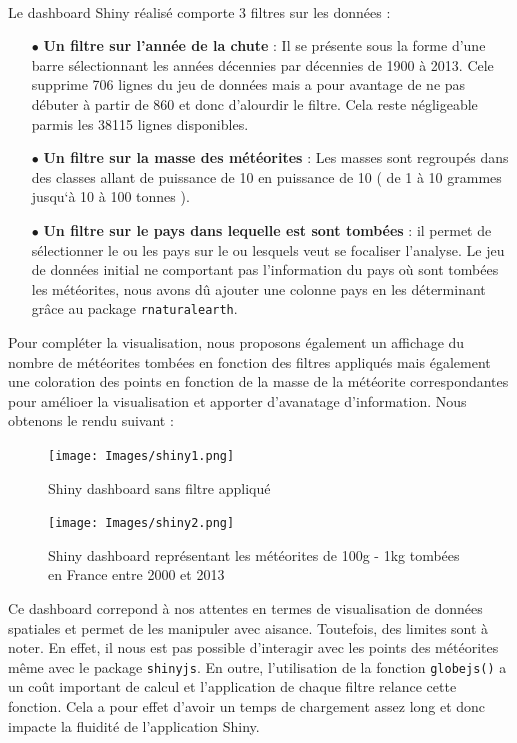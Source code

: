 \documentclass[12pt]{article}
\begin{document}
\\
Le dashboard Shiny réalisé comporte 3 filtres sur les données :\\
\begin{itemize}
    \item[$\bullet$] \textbf{Un filtre sur l'année de la chute} : Il se présente sous la forme d'une barre sélectionnant les années décennies par décennies de 1900 à 2013. Cele supprime 706 lignes du jeu de données mais a pour avantage de ne pas débuter à partir de 860 et donc d'alourdir le filtre. Cela reste négligeable parmis les 38115 lignes disponibles.\\
    \item[$\bullet$] \textbf{Un filtre sur la masse des météorites} : Les masses sont regroupés dans des classes allant de puissance de 10 en puissance de 10 ( de 1 à 10 grammes jusqu`à 10 à 100 tonnes ).\\
    \item[$\bullet$] \textbf{Un filtre sur le pays dans lequelle est sont tombées} : il permet de sélectionner le ou les pays sur le ou lesquels veut se focaliser l'analyse. Le jeu de données initial ne comportant pas l'information du pays où sont tombées les météorites, nous avons dû ajouter une colonne pays en les déterminant grâce au package \texttt{rnaturalearth}.
\end{itemize}
\vspace{0.3cm}
Pour compléter la visualisation, nous proposons également un affichage du nombre de météorites tombées en fonction des filtres appliqués mais également une coloration des points en fonction de la masse de la météorite correspondantes pour amélioer la visualisation et apporter d'avanatage d'information. Nous obtenons le rendu suivant :\\
\begin{figure}[H]
    \centering
    \texttt{[image: Images/shiny1.png]}
        \caption{Shiny dashboard sans filtre appliqué}
\end{figure}

\begin{figure}[H]
    \centering
    \texttt{[image: Images/shiny2.png]}
    \caption{Shiny dashboard représentant les météorites de 100g - 1kg tombées en France entre 2000 et 2013}
\end{figure}
\vspace{0.3cm}
Ce dashboard correpond à nos attentes en termes de visualisation de données spatiales et permet de les manipuler avec aisance. Toutefois, des limites sont à noter. En effet, il nous est pas possible d'interagir avec les points des météorites même avec le package \texttt{shinyjs}. En outre, l'utilisation de la fonction \texttt{globejs()} a un coût important de calcul et l'application de chaque filtre relance cette fonction. Cela a pour effet d'avoir un temps de chargement assez long et donc impacte la fluidité de l'application Shiny.
\end{document}
